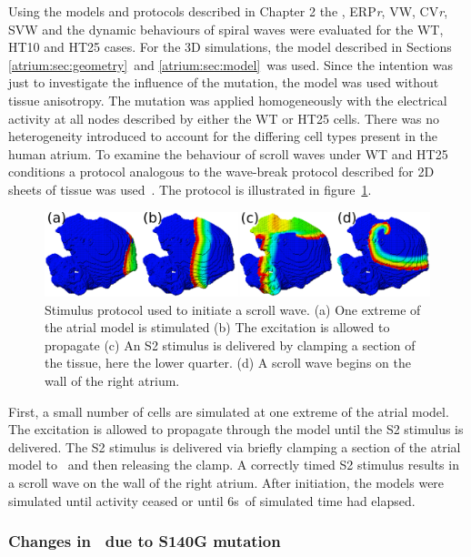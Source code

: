 Using the models and protocols described in Chapter 2 the \apdr, ERP\emph{r}, VW,
CV\emph{r}, SVW and the dynamic behaviours of spiral waves were evaluated for
the WT, HT10 and HT25 cases.
For the 3D simulations, the model described in Sections
\ref{atrium:sec:geometry}\ and \ref{atrium:sec:model}\ was used.
Since the intention was just to investigate the influence of the mutation, the
model was used without tissue anisotropy.
The mutation was applied homogeneously with the electrical activity at all
nodes described by either the WT or HT25 cells.
There was no heterogeneity introduced to account for the differing cell types
present in the human atrium.
To examine the behaviour of scroll waves under WT and HT25 conditions a protocol
analogous to the wave-break protocol described for 2D sheets of tissue was
used~\cite{Kharche2007}.
The protocol is illustrated in figure~\ref{atrium:iks:scroll_init}.
\begin{figure}
\includegraphics{figures/atrium/iks/scrollhowto}
\caption[Initiating a Scroll Wave]{
\label{atrium:iks:scroll_init}
Stimulus protocol used to initiate a scroll wave.
(a) One extreme of the atrial model is stimulated
(b) The excitation is allowed to propagate
(c) An S2 stimulus is delivered by clamping a section of the tissue, here
the lower quarter.
(d) A scroll wave begins on the wall of the right atrium.
}
\end{figure}
First, a small number of cells are simulated at one extreme of the atrial model.
The excitation is allowed to propagate through the model until the S2 stimulus
is delivered.
The S2 stimulus is delivered via briefly clamping a section of the atrial model to
\ and then releasing the clamp.
A correctly timed S2 stimulus results in a scroll wave on the wall of the right
atrium.
After initiation, the models were simulated until activity ceased or until
\unit{6}{s}\ of simulated time had elapsed.

\subsubsection{Changes in \apd\ due to S140G mutation}

